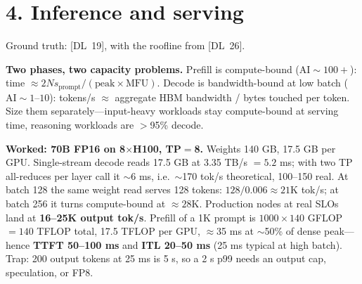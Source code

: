 \section*{4. Inference and serving}

\noindent Ground truth: [DL~19], with the roofline from [DL~26].

\textbf{Two phases, two capacity problems.} Prefill is compute-bound
($\mathrm{AI} \sim 100+$): time $\approx 2N s_{\text{prompt}}/(\text{peak}
\times \text{MFU})$. Decode is bandwidth-bound at low batch ($\mathrm{AI} \sim
1$--$10$): tokens/s $\approx$ aggregate HBM bandwidth / bytes touched per token.
Size them separately---input-heavy workloads stay compute-bound at serving time,
reasoning workloads are $>$95\% decode.

\textbf{Worked: 70B FP16 on 8$\times$H100, TP$=$8.} Weights 140 GB, 17.5 GB per
GPU. Single-stream decode reads 17.5 GB at 3.35 TB/s $= 5.2$ ms; with two TP
all-reduces per layer call it $\sim$6 ms, i.e.\ $\sim$170 tok/s theoretical,
100--150 real. At batch 128 the same weight read serves 128 tokens:
$128/0.006 \approx 21$K tok/s; at batch 256 it turns compute-bound at
$\approx 28$K. Production nodes at real SLOs land at \textbf{16--25K output
tok/s}. Prefill of a 1K prompt is $1000 \times 140$ GFLOP $= 140$ TFLOP total,
17.5 TFLOP per GPU, $\approx$35 ms at $\sim$50\% of dense peak---hence
\textbf{TTFT 50--100 ms} and
\textbf{ITL 20--50 ms} (25 ms typical at high batch). Trap: 200 output tokens at
25 ms is 5 s, so a 2 s p99 needs an output cap, speculation, or FP8.

